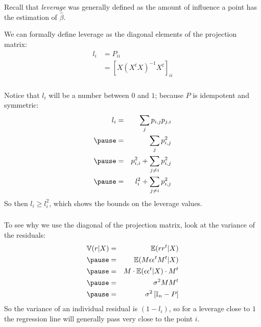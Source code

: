 \begin{frame}[fragile] \frametitle{}

Recall that {\it leverage} was generally defined as the
amount of influence a point has the estimation of
$\widehat{\beta}$.

\pause We can formally define leverage as the diagonal
elements of the projection matrix:
\begin{align*}
l_i &= P_{ii} \\
&= \left[ X (X^t X)^{-1} X^t \right]_{ii}
\end{align*}

\end{frame}

\begin{frame}[fragile] \frametitle{}

Notice that $l_{i}$ will be a number between $0$ and $1$;
because $P$ is idempotent and symmetric:
\begin{eqnarray*}
l_{i} &=& \sum_j p_{i,j} p_{j,i} \\ \pause
&=& \sum_j p_{i,j}^2 \\ \pause
&=& p_{i,i}^2 + \sum_{j \neq i} p_{i,j}^2 \\ \pause
&=& l_{i}^2 + \sum_{j \neq i} p_{i,j}^2
\end{eqnarray*}
\pause So then $l_i \geq l_i^2$, which shows the bounds on the
leverage values.

\end{frame}

\begin{frame}[fragile] \frametitle{}

To see why we use the diagonal of the projection matrix,
look at the variance of the residuals:
\begin{eqnarray*}
\mathbb{V} (r | X) &=& \mathbb{E} (r r^t | X) \\ \pause
&=& \mathbb{E} (M\epsilon \epsilon^t M^t | X) \\ \pause
&=& M \cdot \mathbb{E} (\epsilon \epsilon^t| X) \cdot  M^t \\ \pause
&=& \sigma^2 M M^t \\ \pause
&=& \sigma^2 \left[ \mathbb{I}_n - P \right]
\end{eqnarray*}
\pause So the variance of an individual residual is $(1 - l_i)$, so
for a leverage close to $1$ the regression line will generally pass
very close to the point $i$.

\end{frame}

